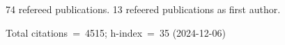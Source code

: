 74 refereed publications. 13 refeered publications as first author.

Total citations~=~4515; h-index~=~35 (2024-12-06)